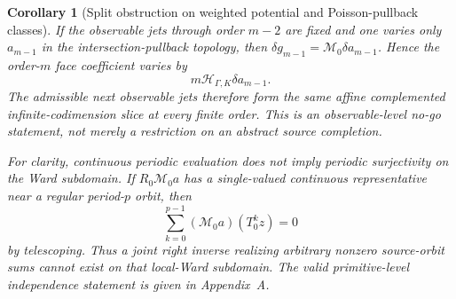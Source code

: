 \documentclass[11pt]{amsart}
\theoremstyle{compactplain}
\newtheorem{corollary}[theorem]{Corollary}
\theoremstyle{compactdefinition}
\theoremstyle{compactremark}
\begin{document}
\begin{corollary}[Split obstruction on weighted potential and Poisson-pullback classes]
If the observable jets through order \(m-2\) are fixed and one varies only
\(a_{m-1}\) in the intersection-pullback topology, then
\(\delta g_{m-1}=\mathcal M_0\delta a_{m-1}\).  Hence the order-\(m\) face
coefficient varies by
\[
 m\mathcal H_{\Gamma,K}\delta a_{m-1}.
\]
The admissible next observable jets therefore form the same affine
complemented infinite-codimension slice at every finite order.  This is an
observable-level no-go statement, not merely a restriction on an abstract
source completion.

For clarity, continuous periodic evaluation does not imply periodic
surjectivity on the Ward subdomain.  If
\(R_0\mathcal M_0a\) has a single-valued continuous representative near a
regular period-\(p\) orbit, then
\begin{equation}
\label{eq:correlation_graph_periodic_telescoping}
 \sum_{k=0}^{p-1}(\mathcal M_0a)(T_0^kz)=0
\end{equation}
by telescoping.  Thus a joint right inverse realizing arbitrary nonzero
source-orbit sums cannot exist on that local-Ward subdomain.  The valid
primitive-level independence statement is given in Appendix~A.
\end{corollary}
\end{document}
